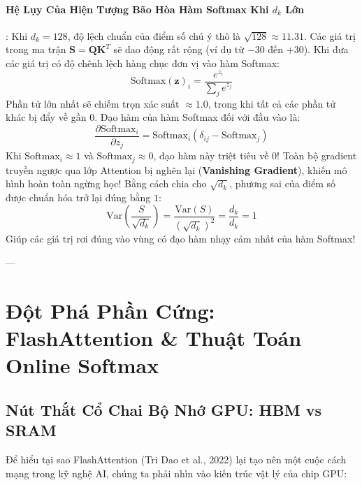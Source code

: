\paragraph{Hệ Lụy Của Hiện Tượng Bão Hòa Hàm Softmax Khi $d_k$ Lớn}:
Khi $d_k = 128$, độ lệch chuẩn của điểm số chú ý thô là $\sqrt{128} \approx 11.31$.
Các giá trị trong ma trận $\mathbf{S} = \mathbf{Q}\mathbf{K}^T$ sẽ dao động rất rộng (ví dụ từ $-30$ đến $+30$).
Khi đưa các giá trị có độ chênh lệch hàng chục đơn vị vào hàm Softmax:
\begin{equation*}
\text{Softmax}(\mathbf{z})_i = \frac{e^{z_i}}{\sum_j e^{z_j}}
\end{equation*}
Phần tử lớn nhất sẽ chiếm trọn xác suất $\approx 1.0$, trong khi tất cả các phần tử khác bị đẩy về gần $0$.
Đạo hàm của hàm Softmax đối với đầu vào là:
\begin{equation}
\frac{\partial \text{Softmax}_i}{\partial z_j} = \text{Softmax}_i (\delta_{ij} - \text{Softmax}_j)
\end{equation}
Khi $\text{Softmax}_i \approx 1$ và $\text{Softmax}_j \approx 0$, đạo hàm này triệt tiêu về $0$!
Toàn bộ gradient truyền ngược qua lớp Attention bị nghẽn lại (\textbf{Vanishing Gradient}), khiến mô hình hoàn toàn ngừng học!
Bằng cách chia cho $\sqrt{d_k}$, phương sai của điểm số được chuẩn hóa trở lại đúng bằng $1$:
\begin{equation}
\text{Var}\left(\frac{S}{\sqrt{d_k}}\right) = \frac{\text{Var}(S)}{(\sqrt{d_k})^2} = \frac{d_k}{d_k} = 1
\end{equation}
Giúp các giá trị rơi đúng vào vùng có đạo hàm nhạy cảm nhất của hàm Softmax!

---

\section{Đột Phá Phần Cứng: FlashAttention \& Thuật Toán Online Softmax}
\label{sec:flashattention-deepdive}

\subsection{Nút Thắt Cổ Chai Bộ Nhớ GPU: HBM vs SRAM}
Để hiểu tại sao FlashAttention (Tri Dao et al., 2022) lại tạo nên một cuộc cách mạng trong kỹ nghệ AI, chúng ta phải nhìn vào kiến trúc vật lý của chip GPU:

